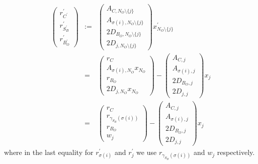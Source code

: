 \documentclass[a4paper]{article}
\begin{document}
\begin{eqnarray}
\left(
\begin{array}{c}
r_{C^{\prime}}^{\prime} \\
\hline
r_{S_{B}^{\prime}}^{\prime} \\
\hline
r_{B_{O}^{\prime}}^{\prime}
\end{array}
\right)
&:=&
\left(
\begin{array}{c}
A_{C, N_{O} \setminus \{j\}} \\
\hline
A_{\sigma(i), N_{O} \setminus \{j\}} \\
\hline
2D_{B_{O}, N_{O} \setminus \{j\}} \\
\hline
2D_{j, N_{O} \setminus \{j\}} 
\end{array}
\right)
x_{N_{O} \setminus \{j\}}^{\prime} 
\nonumber \\
&=&
\left(
\begin{array}{c}
r_{C} \\
\hline
A_{\sigma(i), N_{O}}x_{N_{O}} \\
\hline
r_{B_{O}} \\
\hline
2D_{j, N_{O}}x_{N_{O}}
\end{array}
\right)
-
\left(
\begin{array}{c}
A_{C, j} \\
\hline
A_{\sigma(i), j} \\
\hline
2D_{B_{O}, j} \\
\hline
2D_{j, j}
\end{array}
\right)
x_{j}
\nonumber \\
&=&
\left(
\begin{array}{c}
r_{C} \\
\hline
r_{\gamma_{S_{B}}(\sigma(i))} \\
\hline
r_{B_{O}} \\
\hline
w_{j}
\end{array}
\right)
-
\left(
\begin{array}{c}
A_{C, j} \\
\hline
A_{\sigma(i), j} \\
\hline
2D_{B_{O}, j} \\
\hline
2D_{j, j}
\end{array}
\right)
x_{j}
\end{eqnarray}
where in the last equality for $r_{\sigma(i)}^{\prime}$ and $r_{j}^{\prime}$ we
use $r_{\gamma_{S_{B}}(\sigma(i))}$ and $w_{j}$ respectively.
\end{document}
